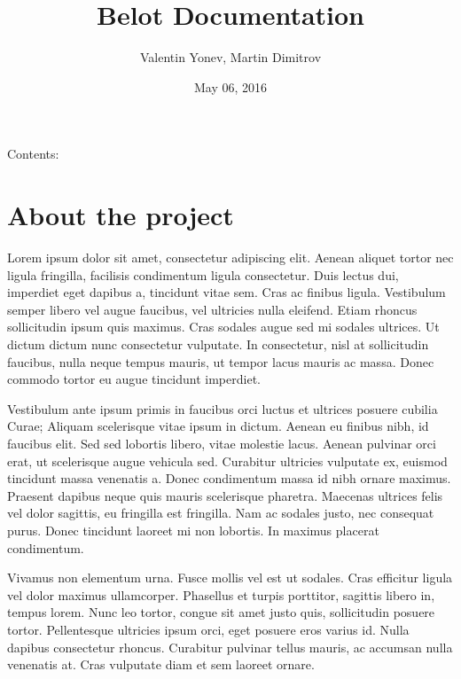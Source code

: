 \documentclass[letterpaper,10pt,english]{sphinxmanual}
\title{Belot Documentation}
\date{May 06, 2016}
\author{Valentin Yonev, Martin Dimitrov}
\begin{document}
\maketitle
\tableofcontents
{}\label{index::doc}


Contents:


\chapter{About the project}
\label{about_the_project::doc}\label{about_the_project:welcome-to-belot-s-documentation}\label{about_the_project:about-the-project}
Lorem ipsum dolor sit amet, consectetur adipiscing elit. Aenean aliquet tortor nec ligula fringilla, facilisis condimentum ligula consectetur. Duis lectus dui, imperdiet eget dapibus a, tincidunt vitae sem. Cras ac finibus ligula. Vestibulum semper libero vel augue faucibus, vel ultricies nulla eleifend. Etiam rhoncus sollicitudin ipsum quis maximus. Cras sodales augue sed mi sodales ultrices. Ut dictum dictum nunc consectetur vulputate. In consectetur, nisl at sollicitudin faucibus, nulla neque tempus mauris, ut tempor lacus mauris ac massa. Donec commodo tortor eu augue tincidunt imperdiet.

Vestibulum ante ipsum primis in faucibus orci luctus et ultrices posuere cubilia Curae; Aliquam scelerisque vitae ipsum in dictum. Aenean eu finibus nibh, id faucibus elit. Sed sed lobortis libero, vitae molestie lacus. Aenean pulvinar orci erat, ut scelerisque augue vehicula sed. Curabitur ultricies vulputate ex, euismod tincidunt massa venenatis a. Donec condimentum massa id nibh ornare maximus. Praesent dapibus neque quis mauris scelerisque pharetra. Maecenas ultrices felis vel dolor sagittis, eu fringilla est fringilla. Nam ac sodales justo, nec consequat purus. Donec tincidunt laoreet mi non lobortis. In maximus placerat condimentum.

Vivamus non elementum urna. Fusce mollis vel est ut sodales. Cras efficitur ligula vel dolor maximus ullamcorper. Phasellus et turpis porttitor, sagittis libero in, tempus lorem. Nunc leo tortor, congue sit amet justo quis, sollicitudin posuere tortor. Pellentesque ultricies ipsum orci, eget posuere eros varius id. Nulla dapibus consectetur rhoncus. Curabitur pulvinar tellus mauris, ac accumsan nulla venenatis at. Cras vulputate diam et sem laoreet ornare.
\end{document}

